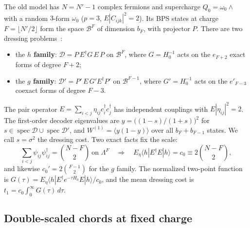 \documentclass[11pt]{article}
\newcommand{\Np}{N'}
\newcommand{\Dc}{\mathcal D}
\newcommand{\Wone}{W^{(1)}}
\theoremstyle{plain}
\theoremstyle{remark}
\numberwithin{equation}{section}
\begin{document}
The old model has $N=\Np-1$ complex fermions and supercharge $Q_0=\omega_0\wedge$ with a random $3$-form $\omega_0$
($p=3$, $E|C_{ijk}|^2=2$). Its BPS states at charge $F=\lfloor\Np/2\rfloor$ form the space $\mathcal B^F$ of dimension
$b_F$, with projector $P$. There are two dressing problems~\cite{prog1013}:
\begin{itemize}\itemsep1pt
\item the \textbf{$h$ family}: $\Dc=P\,E^\dagger G\,E\,P$ on $\mathcal B^F$, where $G=H_0^{-1}$ acts on the
  $e_{F+2}$ exact forms of degree $F+2$;
\item the \textbf{$g$ family}: $\Dc'=P'\,E\,G'E^\dagger P'$ on $\mathcal B^{F-1}$, where $G'=H_0^{-1}$ acts on the
  $e'_{F-3}$ coexact forms of degree $F-3$.
\end{itemize}
The pair operator $E=\sum_{i<j}\eta_{ij}c_i^\dagger c_j^\dagger$ has independent couplings with $E|\eta_{ij}|^2=2$. The
first-order decoder eigenvalues are $y=\big((1-s)/(1+s)\big)^2$ for $s\in\operatorname{spec}\Dc\cup\operatorname{spec}\Dc'$,
and $\Wone=\langle y(1-y)\rangle$ over all $b_F+b_{F-1}$ states. We call $s=\sigma^2$ the dressing cost. Two exact
facts fix the scale:
\begin{equation}\label{eq:c0}
\textstyle\sum_{i<j}\psi_{ij}\psi_{ij}^\dagger=\binom{N-F}{2}\ \text{on }\Lambda^F
\quad\Rightarrow\quad
E_\eta\langle h|E^\dagger E|h\rangle=c_0\equiv2\binom{N-F}{2},
\end{equation}
and likewise $c_0'=2\binom{F-1}{2}$ for the $g$ family. The normalized two-point function is
$G(\tau)=E_\eta\langle h|E^\dagger e^{-\tau H_0}E|h\rangle/c_0$, and the mean dressing cost is
$t_1=c_0\int_0^\infty G(\tau)\,d\tau$.

\subsection{Double-scaled chords at fixed charge}
\end{document}
